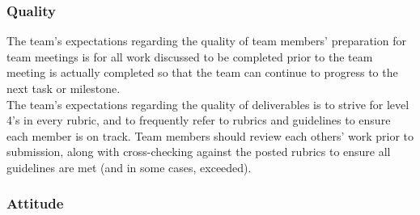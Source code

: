 \documentclass{article}
\begin{document}
\subsubsection*{Quality} 

The team's expectations regarding the quality of team members' preparation for team meetings
is for all work discussed to be completed prior to the team meeting is actually completed so
that the team can continue to progress to the next task or milestone.\\
\indent The team's expectations regarding the quality of deliverables is to strive for level
4's in every rubric, and to frequently refer to rubrics and guidelines to ensure each member
is on track. Team members should review each others' work prior to submission, along with
cross-checking against the posted rubrics to ensure all guidelines are met
(and in some cases, exceeded).


\subsubsection*{Attitude}
\end{document}
